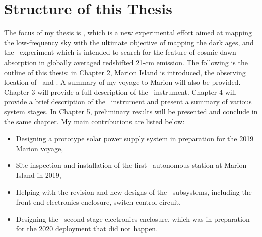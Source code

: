 \section{Structure of this Thesis}

The focus of my thesis is \albatros, which is a new experimental effort aimed at mapping the low-frequency sky with the ultimate objective of mapping the dark ages, and the \prizm\ experiment which is intended to search for the feature of cosmic dawn absorption in globally averaged redshifted 21-cm emission. The following is the outline of this thesis: in Chapter 2, Marion Island is introduced, the observing location of \prizm\ and \albatros. A summary of my voyage to Marion will also be provided. Chapter 3 will provide a full description of the \albatros\ instrument. Chapter 4 will provide a brief description of the \prizm\ instrument and present a summary of various system stages. In Chapter 5, preliminary results will be presented and conclude in the same chapter. My main contributions are listed below:
\begin{itemize}
	\item Designing a prototype solar power supply system in preparation for the 2019 Marion voyage, 
	\item Site inspection and installation of the first \albatros\ autonomous station at Marion Island in 2019,
	\item Helping with the revision and new designs of the \prizm\ subsystems, including the front end electronics enclosure, switch control circuit, 
	\item Designing the \prizm\ second stage electronics enclosure, which was in preparation for the 2020 deployment that did not happen.
\end{itemize}
